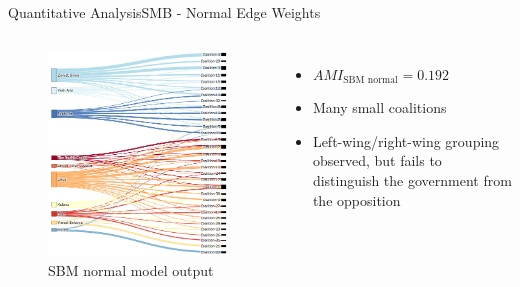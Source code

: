 \documentclass[xcolor=dvipsnames]{beamer}
\newcommand{\AMI}{\mathit{AMI}}
\begin{document}
\begin{frame}{Quantitative Analysis}{SMB - Normal Edge Weights}
  \small
  \begin{columns}
  \begin{figure}
    \includegraphics[width=\linewidth]{sbm_norm}
    \caption{SBM normal model output}
  \end{figure}
  \begin{itemize}
    \item $\AMI_{\text{SBM normal}} = 0.192$
    \item Many small coalitions
    \item Left-wing/right-wing grouping observed, but fails to distinguish the government from the opposition
  \end{itemize}
  \end{columns}
\end{frame}
\end{document}
